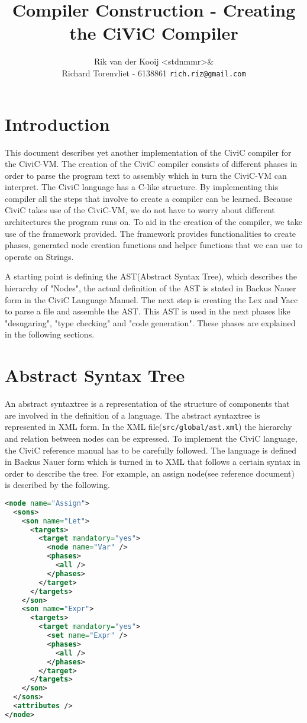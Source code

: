 \documentclass[a4paper]{article}
\author{Rik van der Kooij <stdnmmr>\& \\
Richard Torenvliet - 6138861 \texttt{rich.riz@gmail.com}}
\title{Compiler Construction - Creating the CiViC Compiler}
\begin{document}
\tableofcontents
\maketitle
\section{Introduction}
This document describes yet another implementation of the CiviC compiler for
the CiviC-VM. The creation of the CiviC compiler consists of different phases
in order to parse the program text to assembly which in turn the CiviC-VM can
interpret. The CiviC language has a C-like structure. By implementing this
compiler all the steps that involve to create a compiler can be learned.
Because CiviC takes use of the CiviC-VM, we do not have to worry about
different architectures the program runs on. To aid in the creation of the
compiler, we take use of the framework provided. The framework provides
functionalities to create phases, generated node creation functions and helper
functions that we can use to operate on Strings.

A starting point is defining the AST(Abstract Syntax Tree), which
describes the hierarchy of "Nodes", the actual definition of the AST is stated
in Backus Nauer form in the CiviC Language Manuel. The next step is creating the Lex and Yacc to parse a
file and assemble the AST. This AST is used in the next phases like "desugaring", "type checking" and "code generation". These phases are explained in the following sections.

\section{Abstract Syntax Tree}
An abstract syntaxtree is a representation of the structure of components that
are involved in the definition of a language.
The abstract syntaxtree is represented in XML form. In the XML
file(\texttt{src/global/ast.xml}) the hierarchy and relation between nodes can
be expressed. To implement the CiviC language, the CiviC reference manual has
to be carefully followed. The language is defined in Backus Nauer form which is
turned in to XML that follows a certain syntax in order to describe the tree.
For example, an assign node(see reference document) is described by the
following.

\begin{lstlisting}[language=XML]
 <node name="Assign">
  <sons>
    <son name="Let">
      <targets>
        <target mandatory="yes">
          <node name="Var" />
          <phases>
            <all />
          </phases>
        </target>
      </targets>
    </son>
    <son name="Expr">
      <targets>
        <target mandatory="yes">
          <set name="Expr" />
          <phases>
            <all />
          </phases>
        </target>
      </targets>
    </son>
  </sons>
  <attributes />
</node>
\end{lstlisting}
\end{document}
